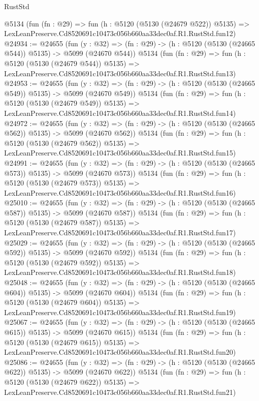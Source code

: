 \begin{lexlean}{RustStd}
\begin{coremodule}
    @5134
    (fun (fn : @29) =>
    fun (h : @5120 (@5130 (@24679 @522)) @5135) =>
    LexLeanPreserve.Cd8520691c10473c056b660aa33dec0af.R1.RustStd.fun12)
@24934 := @24655
    (fun (y : @32) => (fn : @29) -> (h : @5120 (@5130 (@24665 @544)) @5135) -> @5099 (@24670 @544))
    @5134
    (fun (fn : @29) =>
    fun (h : @5120 (@5130 (@24679 @544)) @5135) =>
    LexLeanPreserve.Cd8520691c10473c056b660aa33dec0af.R1.RustStd.fun13)
@24953 := @24655
    (fun (y : @32) => (fn : @29) -> (h : @5120 (@5130 (@24665 @549)) @5135) -> @5099 (@24670 @549))
    @5134
    (fun (fn : @29) =>
    fun (h : @5120 (@5130 (@24679 @549)) @5135) =>
    LexLeanPreserve.Cd8520691c10473c056b660aa33dec0af.R1.RustStd.fun14)
@24972 := @24655
    (fun (y : @32) => (fn : @29) -> (h : @5120 (@5130 (@24665 @562)) @5135) -> @5099 (@24670 @562))
    @5134
    (fun (fn : @29) =>
    fun (h : @5120 (@5130 (@24679 @562)) @5135) =>
    LexLeanPreserve.Cd8520691c10473c056b660aa33dec0af.R1.RustStd.fun15)
@24991 := @24655
    (fun (y : @32) => (fn : @29) -> (h : @5120 (@5130 (@24665 @573)) @5135) -> @5099 (@24670 @573))
    @5134
    (fun (fn : @29) =>
    fun (h : @5120 (@5130 (@24679 @573)) @5135) =>
    LexLeanPreserve.Cd8520691c10473c056b660aa33dec0af.R1.RustStd.fun16)
@25010 := @24655
    (fun (y : @32) => (fn : @29) -> (h : @5120 (@5130 (@24665 @587)) @5135) -> @5099 (@24670 @587))
    @5134
    (fun (fn : @29) =>
    fun (h : @5120 (@5130 (@24679 @587)) @5135) =>
    LexLeanPreserve.Cd8520691c10473c056b660aa33dec0af.R1.RustStd.fun17)
@25029 := @24655
    (fun (y : @32) => (fn : @29) -> (h : @5120 (@5130 (@24665 @592)) @5135) -> @5099 (@24670 @592))
    @5134
    (fun (fn : @29) =>
    fun (h : @5120 (@5130 (@24679 @592)) @5135) =>
    LexLeanPreserve.Cd8520691c10473c056b660aa33dec0af.R1.RustStd.fun18)
@25048 := @24655
    (fun (y : @32) => (fn : @29) -> (h : @5120 (@5130 (@24665 @604)) @5135) -> @5099 (@24670 @604))
    @5134
    (fun (fn : @29) =>
    fun (h : @5120 (@5130 (@24679 @604)) @5135) =>
    LexLeanPreserve.Cd8520691c10473c056b660aa33dec0af.R1.RustStd.fun19)
@25067 := @24655
    (fun (y : @32) => (fn : @29) -> (h : @5120 (@5130 (@24665 @615)) @5135) -> @5099 (@24670 @615))
    @5134
    (fun (fn : @29) =>
    fun (h : @5120 (@5130 (@24679 @615)) @5135) =>
    LexLeanPreserve.Cd8520691c10473c056b660aa33dec0af.R1.RustStd.fun20)
@25086 := @24655
    (fun (y : @32) => (fn : @29) -> (h : @5120 (@5130 (@24665 @622)) @5135) -> @5099 (@24670 @622))
    @5134
    (fun (fn : @29) =>
    fun (h : @5120 (@5130 (@24679 @622)) @5135) =>
    LexLeanPreserve.Cd8520691c10473c056b660aa33dec0af.R1.RustStd.fun21)

\end{coremodule}
\end{lexlean}
